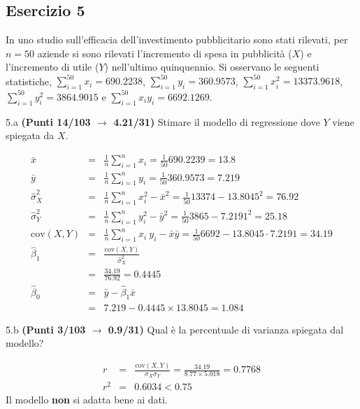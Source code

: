 \documentclass[
  11pt,
]{book}
\theoremstyle{mytheoremstyle}
\theoremstyle{mydefstyle}
\newenvironment{sol}
  {
  \begin{tcolorbox}[enhanced,breakable,arc=0.1mm,boxrule=1pt,colback=white,colframe=iblue,
  title=\bf \fontfamily{lmss}\selectfont \hspace{.5 cm} Soluzione,drop fuzzy shadow]

}{
\end{tcolorbox}
  }
\begin{document}
\subsection{Esercizio 5}\label{esercizio-5-23}

In uno studio sull'efficacia dell'investimento pubblicitario sono stati rilevati, per \(n=50\) aziende si sono rilevati l'incremento di spesa in
pubblicità (\(X\)) e l'incremento di utile (\(Y\)) nell'ultimo quinquennio. Si osservano le seguenti statistiche, \(\sum_{i=1}^{50}x_i=690.2238\), \(\sum_{i=1}^{50}y_i=360.9573\),
\(\sum_{i=1}^{50}x_i^2=13373.9618\), \(\sum_{i=1}^{50}y_i^2=3864.9015\) e \(\sum_{i=1}^{50}x_iy_i=6692.1269\).

5.a \textbf{(Punti 14/103 \(\rightarrow\) 4.21/31)} Stimare il modello di regressione dove \(Y\) viene spiegata da \(X\).

\begin{sol}
\begin{eqnarray*}
           \bar x &=&\frac 1 n\sum_{i=1}^n x_i = \frac {1}{ 50 }  690.2239 =  13.8 \\
           \bar y &=&\frac 1 n\sum_{i=1}^n y_i = \frac {1}{ 50 }  360.9573 =  7.219 \\
           \hat\sigma_X^2&=&\frac 1 n\sum_{i=1}^n x_i^2-\bar x^2=\frac {1}{ 50 }  13374  - 13.8045 ^2= 76.92 \\
           \hat\sigma_Y^2&=&\frac 1 n\sum_{i=1}^n y_i^2-\bar y^2=\frac {1}{ 50 }  3865  - 7.2191 ^2= 25.18 \\
           \text{cov}(X,Y)&=&\frac 1 n\sum_{i=1}^n x_i~y_i-\bar x\bar y=\frac {1}{ 50 }  6692 - 13.8045 \cdot 7.2191 = 34.19 \\
           \hat\beta_1 &=& \frac{\text{cov}(X,Y)}{\hat\sigma_X^2} \\
                    &=& \frac{ 34.19 }{ 76.92 }  =  0.4445 \\
           \hat\beta_0 &=& \bar y - \hat\beta_1 \bar x\\
                    &=&  7.219 - 0.4445 \times  13.8045 = 1.084 
         \end{eqnarray*}

\end{sol}

5.b \textbf{(Punti 3/103 \(\rightarrow\) 0.9/31)} Qual è la percentuale di varianza spiegata dal modello?

\begin{sol}
\begin{eqnarray*}
r&=&\frac{\text{cov}(X,Y)}{\sigma_X\sigma_Y}=\frac{ 34.19 }{ 8.77 \times 5.018 }= 0.7768 \\r^2&=& 0.6034 < 0.75
\end{eqnarray*}
Il modello \textbf{non} si adatta bene ai dati.

\end{sol}
\end{document}
